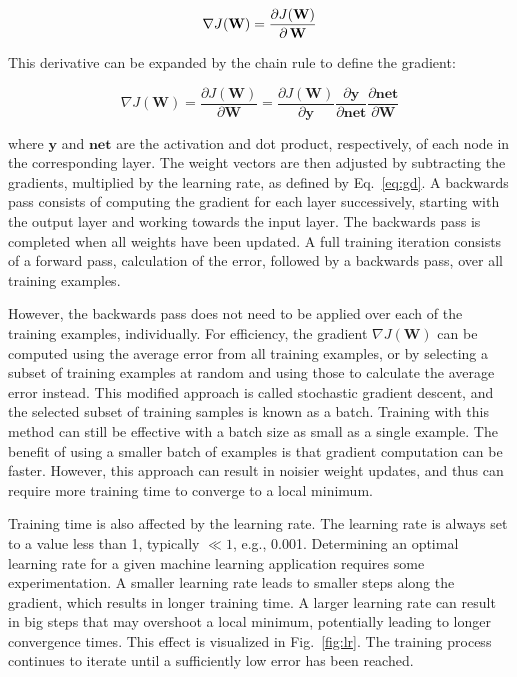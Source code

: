 \documentclass{article}
\begin{document}
\begin{equation}
\label{eq:grad}
   \nabla J(\mathbf{W}) = \frac{\partial J(\mathbf{W})}{\partial \thinspace \mathbf{W}}
\end{equation}

This derivative can be expanded by the chain rule to define the gradient:

\begin{equation}
\label{eq:chain}
   \nabla J(\mathbf{W}) = \frac{\partial J(\mathbf{W})}{\partial \mathbf{W}} = \frac{\partial J(\mathbf{W})}{\partial \mathbf{y}} \frac{\partial \mathbf{y}}{\partial \mathbf{net}} \frac{\partial \mathbf{net}}{{\partial \mathbf{W}}}
\end{equation}

where $\mathbf{y}$ and $\mathbf{\mathbf{net}}$ are the activation and dot product, respectively, of each node in the corresponding layer. The weight vectors 
are then adjusted by subtracting the gradients, multiplied by the learning rate, as defined by Eq.~\ref{eq:gd}. A backwards pass consists of computing the gradient for each layer successively, starting with the output layer and working towards the input layer. The backwards pass is completed when all weights have been updated. A full training iteration consists of a forward pass, calculation of the error, followed by a backwards pass, over all training examples.

However, the backwards pass does not need to be applied over each of the training examples, individually. For efficiency, the gradient $\nabla J(\mathbf{W})$ can be computed using the average error from all training examples, or by selecting a subset of training examples at random and using those to calculate the average error instead. This modified approach is called stochastic gradient descent, and the selected subset of training samples is known as a batch. Training with this method can still be effective with a batch size as small as a single example. The benefit of using a smaller batch of examples is that gradient computation can be faster. However, this approach can result in noisier weight updates, and thus can require more training time to converge to a local minimum. 

Training time is also affected by the learning rate. The learning rate is always set to a value less than 1, typically $\ll 1$, e.g., 0.001. Determining an optimal learning rate for a given machine learning application requires some experimentation. A smaller learning rate leads to smaller steps along the gradient, which results in longer training time. A larger learning rate can result in big steps that may overshoot a local minimum, potentially leading to longer convergence times. This effect is visualized in Fig.~\ref{fig:lr}. The training process continues to iterate until a sufficiently low error has been reached. 
\end{document}
